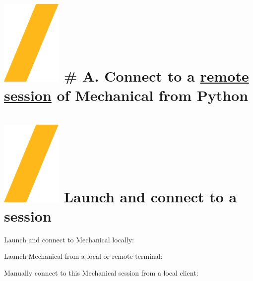 \documentclass[9pt,landscape]{article}
\begin{document}
\begin{multicols}{3}
\setlength{\premulticols}{1pt}
\setlength{\postmulticols}{1pt}
\setlength{\multicolsep}{1pt}
\setlength{\columnsep}{2pt}

\vfill
\section{\includegraphics[height=\fontcharht\font`\S]{slash.png} # A. Connect to a \underline{remote session} of Mechanical from Python}


\section{\includegraphics[height=\fontcharht\font`\S]{slash.png} Launch and connect to a session}

Launch and connect to Mechanical locally:


Launch Mechanical from a local or remote terminal:


Manually connect to this Mechanical session from a local client:





\end{multicols}
\end{document}

